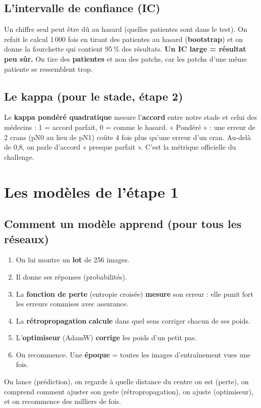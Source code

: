\documentclass[11pt,a4paper]{article}
\begin{document}
\subsection{L'intervalle de confiance (IC)}
Un chiffre seul peut être dû au hasard (quelles patientes sont dans le test). On refait le calcul 1\,000 fois en tirant des patientes au
hasard (\textbf{bootstrap}) et on donne la fourchette qui contient 95\,\% des résultats. \textbf{Un IC large = résultat peu sûr.}
On tire des \textbf{patientes} et non des patchs, car les patchs d'une même patiente se ressemblent trop.

\subsection{Le kappa (pour le stade, étape 2)}
Le \textbf{kappa pondéré quadratique} mesure l'\textbf{accord} entre notre stade et celui des médecins : 1 = accord parfait, 0 = comme
le hasard. « Pondéré » : une erreur de 2 crans (pN0 au lieu de pN1) coûte 4 fois plus qu'une erreur d'un cran. Au-delà de 0,8, on
parle d'accord « presque parfait ». C'est la métrique officielle du challenge.

\section{Les modèles de l'étape 1}\label{sec:modeles}

\subsection{Comment un modèle apprend (pour tous les réseaux)}
\begin{enumerate}
  \item On lui montre un \textbf{lot} de 256 images.
  \item Il donne ses réponses (probabilités).
  \item La \textbf{fonction de perte} (entropie croisée) \textbf{mesure} son erreur : elle punit fort les erreurs commises avec assurance.
  \item La \textbf{rétropropagation} \textbf{calcule} dans quel sens corriger chacun de ses poids.
  \item L'\textbf{optimiseur} (AdamW) \textbf{corrige} les poids d'un petit pas.
  \item On recommence. Une \textbf{époque} = toutes les images d'entraînement vues une fois.
\end{enumerate}
\begin{analogie}
On lance (prédiction), on regarde à quelle distance du centre on est (perte), on comprend comment ajuster son geste
(rétropropagation), on ajuste (optimiseur), et on recommence des milliers de fois.
\end{analogie}
\end{document}
